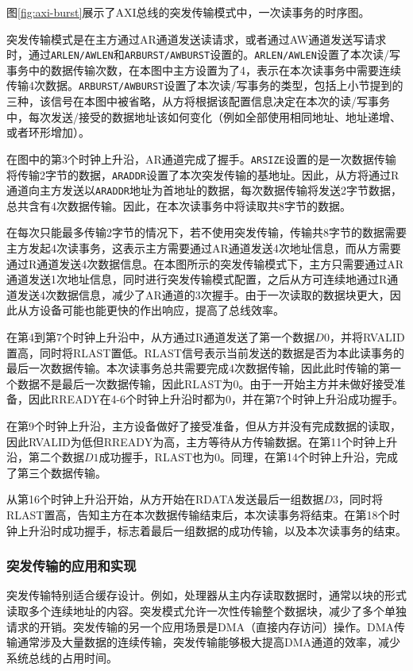 图\ref{fig:axi-burst}展示了AXI总线的突发传输模式中，一次读事务的时序图。

突发传输模式是在主方通过AR通道发送读请求，或者通过AW通道发送写请求时，通过\texttt{ARLEN/AWLEN}和\texttt{ARBURST/AWBURST}设置的。\texttt{ARLEN/AWLEN}设置了本次读/写事务中的数据传输次数，在本图中主方设置为了4，表示在本次读事务中需要连续传输4次数据。\texttt{ARBURST/AWBURST}设置了本次读/写事务的类型，包括上小节提到的三种，该信号在本图中被省略，从方将根据该配置信息决定在本次的读/写事务中，每次发送/接受的数据地址该如何变化（例如全部使用相同地址、地址递增、或者环形增加）。

在图中的第3个时钟上升沿，AR通道完成了握手。\texttt{ARSIZE}设置的是一次数据传输将传输2字节的数据，\texttt{ARADDR}设置了本次突发传输的基地址。因此，从方将通过R通道向主方发送以\texttt{ARADDR}地址为首地址的数据，每次数据传输将发送2字节数据，总共含有4次数据传输。因此，在本次读事务中将读取共8字节的数据。

在每次只能最多传输2字节的情况下，若不使用突发传输，传输共8字节的数据需要主方发起4次读事务，这表示主方需要通过AR通道发送4次地址信息，而从方需要通过R通道发送4次数据信息。在本图所示的突发传输模式下，主方只需要通过AR通道发送1次地址信息，同时进行突发传输模式配置，之后从方可连续地通过R通道发送4次数据信息，减少了AR通道的3次握手。由于一次读取的数据块更大，因此从方设备可能也能更快的作出响应，提高了总线效率。

在第4到第7个时钟上升沿中，从方通过R通道发送了第一个数据\(D0\)，并将RVALID置高，同时将RLAST置低。RLAST信号表示当前发送的数据是否为本此读事务的最后一次数据传输。本次读事务总共需要完成4次数据传输，因此此时传输的第一个数据不是最后一次数据传输，因此RLAST为0。由于一开始主方并未做好接受准备，因此RREADY在4-6个时钟上升沿时都为0，并在第7个时钟上升沿成功握手。

在第9个时钟上升沿，主方设备做好了接受准备，但从方并没有完成数据的读取，因此RVALID为低但RREADY为高，主方等待从方传输数据。在第11个时钟上升沿，第二个数据\(D1\)成功握手，RLAST也为0。同理，在第14个时钟上升沿，完成了第三个数据传输。

从第16个时钟上升沿开始，从方开始在RDATA发送最后一组数据\(D3\)，同时将RLAST置高，告知主方在本次数据传输结束后，本次读事务将结束。在第18个时钟上升沿时成功握手，标志着最后一组数据的成功传输，以及本次读事务的结束。

\subsubsection{突发传输的应用和实现}\label{sec:08-bus-and-soc-023}

突发传输特别适合缓存设计。例如，处理器从主内存读取数据时，通常以块的形式读取多个连续地址的内容。突发模式允许一次性传输整个数据块，减少了多个单独请求的开销。突发传输的另一个应用场景是DMA（直接内存访问）操作。DMA传输通常涉及大量数据的连续传输，突发传输能够极大提高DMA通道的效率，减少系统总线的占用时间。

